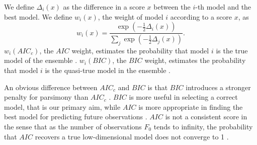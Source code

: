\documentclass[USenglish]{article}
\begin{document}

We define $\Delta_i(x)$ as the difference in a score $x$ between the $i$-th model and the best model. 
\iftoggle{squib}{}
{
Thus, $\Delta_i(BIC)$ is the difference in $BIC$ between the $i$-th model and the best model.
}
We define $w_i(x)$, the weight of model $i$ according to a score $x$, as
\begin{equation*}
w_i(x) = \frac{\exp\left(-\frac{1}{2}\Delta_i(x)\right)}{\sum_j \exp\left(-\frac{1}{2}\Delta_j(x)\right)}.
\end{equation*}
$w_i(AIC_c)$, the $AIC$ weight, estimates the probability that model $i$ is the true model of the ensemble \citep{Wagenmakers2004a,Burnham2002a}. 
$w_i(BIC)$, the $BIC$ weight, estimates the probability that model $i$ is the quasi-true model in the ensemble \citep[p. 297]{Burnham2002a}.
\iftoggle{squib}{}
{
The evidence of model $i$ over model $j$ with respect to some score $x$ is defined as the ratio $\frac{w_i(x)}{w_j(x)}$.
For $AIC$ and $BIC$, one has \citep{Wagenmakers2004a}
\begin{eqnarray*}
\frac{w_i(AIC)}{w_j(AIC)} & = & \frac{L_i}{L_j}exp(K_j-K_i)\\
\frac{w_i(BIC)}{w_j(BIC)} & = & \frac{L_i}{L_j}n^{\frac{1}{2}(K_j-K_i)},
\end{eqnarray*} 
where $L_i$, $K_i$, are the likelihood and the number of parameters of model $i$. For $AIC_c$, it is easy to see that
\begin{eqnarray*}
\frac{w_i(AIC_c)}{w_j(AIC_c)} & = & \frac{L_i}{L_j} exp\left[F_0 \left(\frac{K_j}{F_0-K_j-1} - \frac{K_i}{F_0-K_i-1} \right) \right]\\
\end{eqnarray*} 
} 

An obvious difference between $AIC_c$ and $BIC$ is that $BIC$ introduces a stronger penalty for parsimony than $AIC_c$ \citep{Wagenmakers2004a}. $BIC$ is more useful in selecting a correct model, that is our primary aim, while $AIC$ is more appropriate in finding the best model for predicting future observations \citep{Chakrabarti2011a}. $AIC$ is not a consistent score in the sense that
as the number of observations $F_0$ tends to infinity, the probability that $AIC$ recovers a true low-dimensional model does not converge to 1 \citep{Wagenmakers2004a}.
\end{document}
